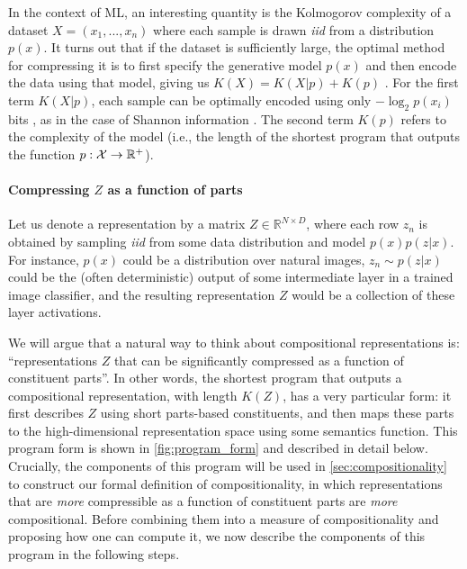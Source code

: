 \documentclass{article}
\begin{document}
In the context of ML, an interesting quantity is the Kolmogorov complexity of a dataset $X = (x_1, ..., x_n)$ where each sample is drawn \textit{iid} from a distribution $p(x)$. It turns out that if the dataset is sufficiently large, the optimal method for compressing it is to first specify the generative model $p(x)$ and then encode the data using that model, giving us $K(X) = K(X|p) + K(p)$ \citep{fortnow2000kolmogorov}. For the first term $K(X|p)$, each sample can be optimally encoded using only $-\log_2p(x_i)$ bits \citep{witten1987arithmetic}, as in the case of Shannon information \citep{shannon2001mathematical}. The second term $K(p)$ refers to the complexity of the model (i.e., the length of the shortest program that outputs the function $p: \mathcal{X} \rightarrow {\mathbb{R}}^+$).

\paragraph{Compressing $Z$ as a function of parts}

Let us denote a representation by a matrix $Z \in \mathbb{R}^{N \times D}$, where each row $z_n$ is obtained by sampling \textit{iid} from some data distribution and model $p(x)p(z|x)$. For instance, $p(x)$ could be a distribution over natural images, $z_n \sim p(z|x)$ could be the (often deterministic) output of some intermediate layer in a trained image classifier, and the resulting representation $Z$ would be a collection of these layer activations.

We will argue that a natural way to think about compositional representations is: ``representations $Z$ that can be significantly compressed as a function of constituent parts''. In other words, the shortest program that outputs a compositional representation, with length $K(Z)$, has a very particular form: it first describes $Z$ using short parts-based constituents, and then maps these parts to the high-dimensional representation space using some semantics function. This program form is shown in \cref{fig:program_form} and described in detail below. Crucially, the components of this program will be used in \cref{sec:compositionality} to construct our formal definition of compositionality, in which representations that are \emph{more} compressible as a function of constituent parts are \emph{more} compositional. Before combining them into a measure of compositionality and proposing how one can compute it, we now describe the components of this program in the following steps.
\end{document}
